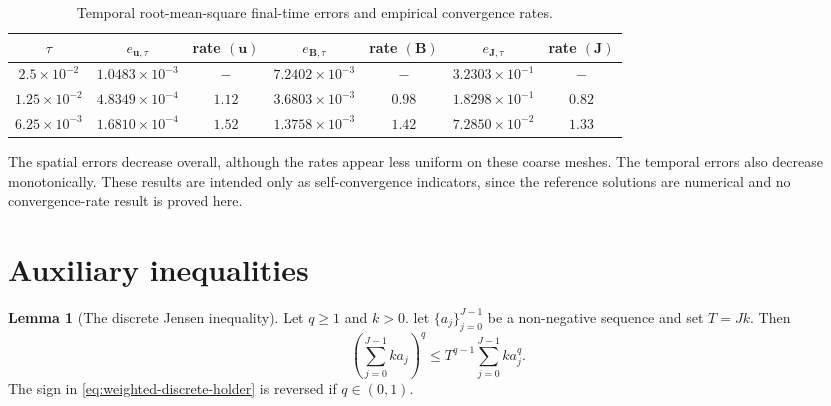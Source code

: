 \documentclass[11pt, reqno]{amsart}
\theoremstyle{definition}
\newtheorem{lemma}[theorem]{Lemma}
\numberwithin{equation}{section}
\newcommand{\bff}{\boldsymbol}
\begin{document}
\begin{table}[htbp]
	\centering
	\small
	\caption{Temporal root-mean-square final-time errors and empirical
		convergence rates.}
	\label{tab:temporal convergence L2}
	\begin{tabular}{c c c c c c c}
		\hline
		$\tau$
		&
		$e_{\bff u,\tau}$
		&
		rate $(\bff u)$
		&
		$e_{\bff B,\tau}$
		&
		rate $(\bff B)$
		&
		$e_{\bff J,\tau}$
		&
		rate $(\bff J)$
		\\
		\hline
		$2.5\times10^{-2}$
		&
		$1.0483\times10^{-3}$
		&
		$-$
		&
		$7.2402\times10^{-3}$
		&
		$-$
		&
		$3.2303\times10^{-1}$
		&
		$-$
		\\
		$1.25\times10^{-2}$
		&
		$4.8349\times10^{-4}$
		&
		$1.12$
		&
		$3.6803\times10^{-3}$
		&
		$0.98$
		&
		$1.8298\times10^{-1}$
		&
		$0.82$
		\\
		$6.25\times10^{-3}$
		&
		$1.6810\times10^{-4}$
		&
		$1.52$
		&
		$1.3758\times10^{-3}$
		&
		$1.42$
		&
		$7.2850\times10^{-2}$
		&
		$1.33$
		\\
		\hline
	\end{tabular}
\end{table}

The spatial errors decrease overall, although the rates appear less uniform on these coarse meshes. 
The temporal errors also decrease monotonically. These results are intended only as self-convergence indicators, since the reference solutions are numerical and no convergence-rate result is proved here.







\appendix

\section{Auxiliary inequalities}\label{subsec:aux-estimates}

\begin{lemma}[The discrete Jensen inequality]\label{lem:weighted-discrete-holder}
	Let \(q\ge1\) and $k>0$. let \(\{a_j\}_{j=0}^{J-1}\) be a non-negative sequence and set $T=Jk$. Then
	\begin{equation}\label{eq:weighted-discrete-holder}
		\left(
		\sum_{j=0}^{J-1} k a_j
		\right)^q
		\le
		T^{q-1}
		\sum_{j=0}^{J-1} k a_j^q.
	\end{equation}
	The sign in \eqref{eq:weighted-discrete-holder} is reversed if $q\in (0,1)$.
\end{lemma}
\end{document}
